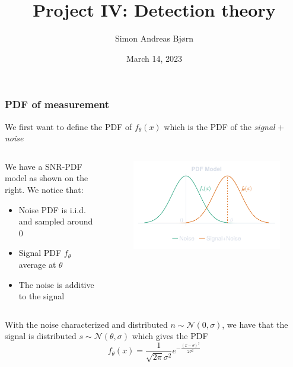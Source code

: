 \documentclass[compress]{beamer}
\title{Project IV: Detection theory}
\subtitle{}
\author{\Large Simon Andreas Bjørn}
\date{\large March 14, 2023}
\begin{document}
\begin{frame}
    \maketitle
\end{frame}

\begin{frame} %
    \frametitle{PDF of measurement}
    We first want to define the PDF of $f_\theta\left(x\right)$ which is the
    PDF of the {\em signal} + {\em noise}
    \begin{columns}
        \begin{column}{0.5\textwidth}
            We have a SNR-PDF model as shown on the right.
            We notice that:
            \begin{itemize}
                \item Noise PDF is i.i.d. and sampled around 0
                \item Signal PDF $f_\theta$ average at $\theta$
                \item The noise is additive to the signal
            \end{itemize}
        \end{column}
        \begin{column}{0.5\textwidth}
            \begin{figure}
                \includegraphics[width=\columnwidth]{"../PDFs.pdf"}
            \end{figure}
        \end{column}
    \end{columns}
    With the noise characterized and distributed $n \sim \mathcal{N}\left(0,\sigma\right)$, we have that
    the signal is distributed $s \sim \mathcal{N}\left(\theta,\sigma\right)$
    which gives the PDF
    \begin{equation*}
        f_\theta (x) = \frac{1}{\sqrt{2\pi}\sigma^2}e^{-\frac{\left(x-\theta\right)^2}{2\sigma^2}}
    \end{equation*}
\end{frame} %
\end{document}
